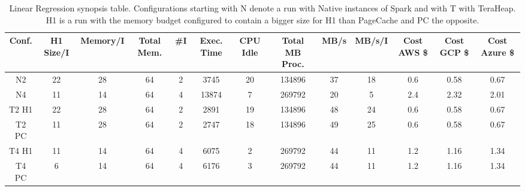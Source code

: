 \begin{table}[htbp]
	\begin{subtable}[b]{0.45\linewidth}
  \caption{Linear Regression synopsis table. Configurations starting
    with N denote a run with Native instances of Spark and with T with
    TeraHeap. H1 is a run with the memory budget configured to contain
    a bigger size for H1 than PageCache and PC the opposite.}
  \label{tab:linr_table}
        \begin{tabular}{|c|c|c|c|c|c|c|c|c|c|c|c|c|}
      \hline
\textbf{Conf.} & \textbf{H1 Size/I} & \textbf{Memory/I} & \textbf{Total Mem.} & \textbf{\#I} & \textbf{Exec. Time} & \textbf{CPU Idle} & \textbf{Total MB Proc.} & \textbf{MB/s} & \textbf{MB/s/I} & \textbf{Cost AWS \$} & \textbf{Cost GCP \$} & \textbf{Cost Azure \$} \\
	\hline 
      N2 & 22 & 28 & 64 & 2 & 3745 & 20 & 134896 & 37 & 18 & 0.6 & 0.58 & 0.67 \\ 
      N4 & 11 & 14 & 64 & 4 & 13874 & 7 & 269792 & 20 & 5 & 2.4 & 2.32 & 2.01 \\
      T2 H1 & 22 & 28 & 64 & 2 & 2891 & 19 & 134896 & 48 & 24 & 0.6 & 0.58 & 0.67 \\
      T2 PC & 11 & 28 & 64 & 2 & 2747 & 18 & 134896 & 49 & 25 & 0.6 & 0.58 & 0.67 \\
      T4 H1 & 11 & 14 & 64 & 4 & 6075 & 2 & 269792 & 44 & 11 & 1.2 & 1.16 & 1.34 \\
      T4 PC & 6 & 14 & 64 & 4 & 6176 & 3 & 269792 & 44 & 11 & 1.2 & 1.16 & 1.34 \\ 
      \hline
     \end{tabular}%
\end{subtable}
	\vspace{1em}
\end{table}
\fi
\iffalse
